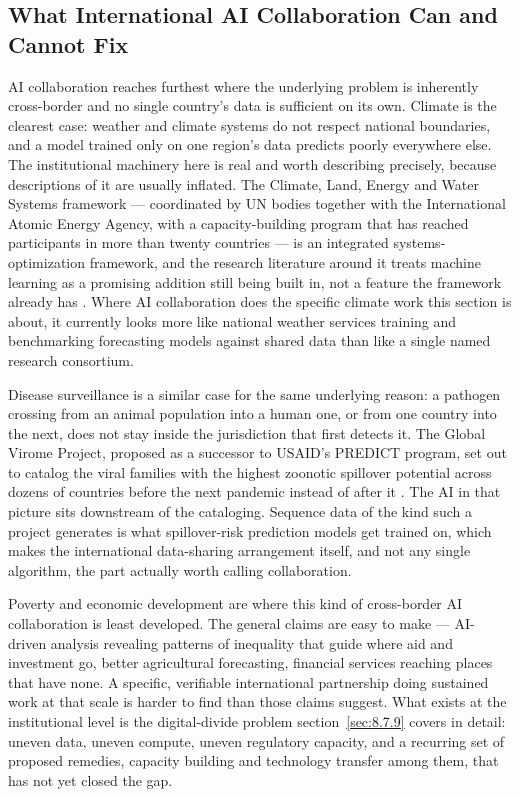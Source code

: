 \subsection{What International AI Collaboration Can and Cannot Fix}
\label{sec:8.7.3}
AI collaboration reaches furthest where the underlying problem is inherently cross-border and no single country's data is sufficient on its own. Climate is the clearest case: weather and climate systems do not respect national boundaries, and a model trained only on one region's data predicts poorly everywhere else. The institutional machinery here is real and worth describing precisely, because descriptions of it are usually inflated. The Climate, Land, Energy and Water Systems framework — coordinated by UN bodies together with the International Atomic Energy Agency, with a capacity-building program that has reached participants in more than twenty countries — is an integrated systems-optimization framework, and the research literature around it treats machine learning as a promising addition still being built in, not a feature the framework already has \autocite{alexander2025clews}. Where AI collaboration does the specific climate work this section is about, it currently looks more like national weather services training and benchmarking forecasting models against shared data than like a single named research consortium.

Disease surveillance is a similar case for the same underlying reason: a pathogen crossing from an animal population into a human one, or from one country into the next, does not stay inside the jurisdiction that first detects it. The Global Virome Project, proposed as a successor to USAID's PREDICT program, set out to catalog the viral families with the highest zoonotic spillover potential across dozens of countries before the next pandemic instead of after it \autocite{carroll2018virome}. The AI in that picture sits downstream of the cataloging. Sequence data of the kind such a project generates is what spillover-risk prediction models get trained on, which makes the international data-sharing arrangement itself, and not any single algorithm, the part actually worth calling collaboration.

Poverty and economic development are where this kind of cross-border AI collaboration is least developed. The general claims are easy to make — AI-driven analysis revealing patterns of inequality that guide where aid and investment go, better agricultural forecasting, financial services reaching places that have none. A specific, verifiable international partnership doing sustained work at that scale is harder to find than those claims suggest. What exists at the institutional level is the digital-divide problem section~\ref{sec:8.7.9} covers in detail: uneven data, uneven compute, uneven regulatory capacity, and a recurring set of proposed remedies, capacity building and technology transfer among them, that has not yet closed the gap.

